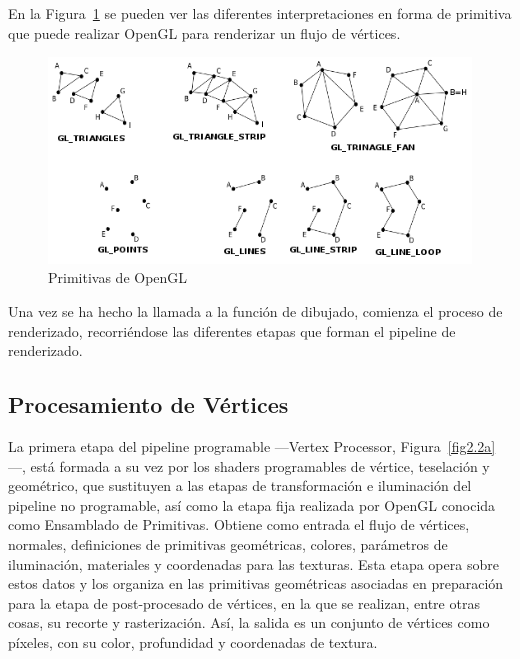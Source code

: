 En la Figura~\ref{fig:primitives} se pueden ver las diferentes interpretaciones
en forma de primitiva que puede realizar OpenGL para renderizar un flujo de
vértices. \\

\begin{figure}[h]
	\centering	
	\includegraphics[width=\textwidth]{figures/primitives.png}
	\caption{Primitivas de OpenGL}
	\label{fig:primitives}
\end{figure}

Una vez se ha hecho la llamada a la función de dibujado, comienza el proceso de
renderizado, recorriéndose las diferentes etapas que forman el pipeline de
renderizado. \\

\subsection{Procesamiento de Vértices}
\label{ref:procesamiento}

La primera etapa del pipeline programable ---Vertex Processor,
Figura~\ref{fig2.2a}---, está formada a su vez por los shaders programables de
vértice, teselación y geométrico, que sustituyen a las etapas de transformación
e iluminación del pipeline no programable, así como la etapa fija realizada por
OpenGL conocida como Ensamblado de Primitivas. Obtiene como entrada el flujo de
vértices, normales, definiciones de primitivas geométricas, colores, parámetros
de iluminación, materiales y coordenadas para las texturas. Esta etapa opera
sobre estos datos y los organiza en las primitivas geométricas asociadas en
preparación para la etapa de post-procesado de vértices, en la que se realizan,
entre otras cosas, su recorte y rasterización.  Así, la salida es un conjunto de
vértices como píxeles, con su color, profundidad y coordenadas de textura.\\

